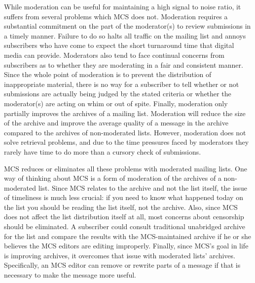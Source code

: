 While moderation can be useful for maintaining a high signal to noise ratio, it 
suffers from several problems which MCS does not. Moderation requires a
substantial commitment on the part of the moderator(s) to review submissions
in a timely manner. Failure to do so halts all traffic on the mailing list and
annoys subscribers who have come to expect the short turnaround time that
digital media can provide. Moderators also tend to face continual concerns from 
subscribers as to whether they are moderating in a fair and consistent
manner. Since the whole point of moderation is to prevent the distribution of
inappropriate material, there is no way for a subscriber to tell whether or not 
submissions are actually being judged by the stated criteria or whether the
moderator(s) are acting on whim or out of spite. Finally, moderation only
partially improves the archives of a mailing list. Moderation will reduce the
size of the archive and improve the average quality of a message in the archive 
compared to the archives of non-moderated lists. However, moderation does not
solve retrieval problems, and due to the time pressures faced by moderators
they rarely have time to do more than a cursory check of submissions.

MCS reduces or eliminates all these problems with moderated mailing lists. One
way of thinking about MCS is a form of moderation of the archives of a
non-moderated list. Since MCS relates to the archive and not the list itself,
the issue of timeliness is much less crucial: if you need to know what happened
today on the list you should be reading the list itself, not the archive. Also,
since MCS does not affect the list distribution itself at all, most concerns
about censorship should be eliminated. A subscriber could consult traditional
unabridged archive for the list and compare the results with the MCS-maintained
archive if he or she believes the MCS editors are editing improperly. Finally,
since MCS's goal in life is improving archives, it overcomes that issue with
moderated lists' archives. Specifically, an MCS editor can remove or rewrite
parts of a message if that is necessary to make the message more useful.

